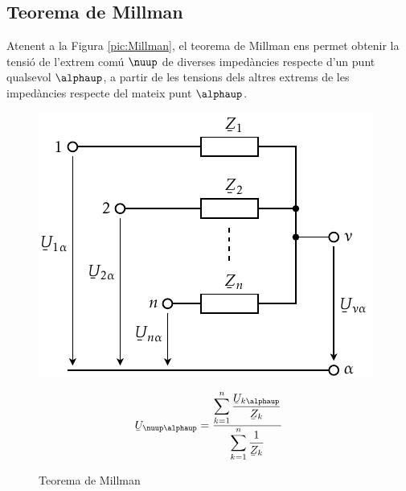 \subsection{Teorema de Millman}\label{sec:millman}

Atenent a la Figura \vref{pic:Millman}, el teorema
de Millman ens permet
obtenir la tensi\'{o} de l'extrem com\'{u} $\nuup$ de diverses imped\`{a}ncies respecte d'un punt
qualsevol $\alphaup$, a partir de les tensions dels altres extrems de les imped\`{a}ncies respecte
 del mateix punt $\alphaup$.

\begin{figure}[htb]
\hfill
\begin{minipage}[b]{7cm}
    \includegraphics{Imatges/Cap-Fonaments-Millman.pdf}
    \caption{Teorema de Millman} \label{pic:Millman}
\end{minipage}
\hfill
\begin{minipage}[b][4.5cm][t]{6cm}
    \begin{equation}
        \cmplx{U}_{\nuup\alphaup} = \frac{\displaystyle\sum_{k=1}^n \dfrac{\cmplx{U}_{k\alphaup}}{\cmplx{Z}_k}} {\displaystyle\sum_{k=1}^n \dfrac{1}{\cmplx{Z}_k}}
    \end{equation}
\end{minipage}
\end{figure}

\pagebreak

